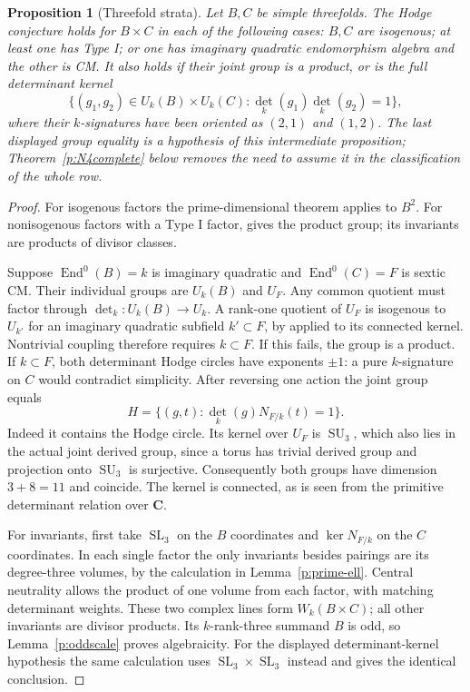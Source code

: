 \documentclass[11pt,reqno]{article}
\theoremstyle{emphasizedplain}
\newtheorem{proposition}[theorem]{Proposition}
\theoremstyle{emphasizeddefinition}
\theoremstyle{emphasizeddefinition}
\DeclareMathOperator{\End}{End}
\DeclareMathOperator{\SL}{SL}
\DeclareMathOperator{\SU}{SU}
\newcommand{\C}{\mathbf C}
\begin{document}
\begin{proposition}[Threefold strata]\label{p:N4strata}
Let $B,C$ be simple threefolds. The Hodge conjecture holds for $B\times C$
in each of the following cases: $B,C$ are isogenous; at least one has
Type I; or one has imaginary quadratic endomorphism algebra and the
other is CM. It also holds if their joint group is a product, or is the
full determinant kernel
\[
 \{(g_1,g_2)\in U_k(B)\times U_k(C):\det_k(g_1)\det_k(g_2)=1\},
\]
where their $k$-signatures have been oriented as $(2,1)$ and $(1,2)$.
The last displayed group equality is a hypothesis of this intermediate
proposition; Theorem~\ref{p:N4complete} below removes the need to
assume it in the classification of the whole row.
\end{proposition}
\begin{proof}
For isogenous factors the prime-dimensional theorem applies to $B^2$.
For nonisogenous factors with a Type I factor,
\cite[Proposition (2.4), Lemma (3.4)]{MZ} gives the product group;
its invariants are products of divisor classes.

Suppose $\End^0(B)=k$ is imaginary quadratic and $\End^0(C)=F$ is
sextic CM. Their individual groups are $U_k(B)$ and $U_F$.
Any common quotient must factor through $\det_k:U_k(B)\to U_k$.
A rank-one quotient of $U_F$ is isogenous to $U_{k'}$ for an imaginary
quadratic subfield $k'\subset F$, by \cite[Lemma (3.7)]{MZ} applied
to its connected kernel. Nontrivial coupling therefore requires
$k\subset F$. If this fails, the group is a product.
If $k\subset F$, both determinant Hodge circles have exponents $\pm1$:
a pure $k$-signature on $C$ would contradict simplicity.
After reversing one action the joint group equals
\[
 H=\{(g,t):\det_k(g)N_{F/k}(t)=1\}.
\]
Indeed it contains the Hodge circle. Its kernel over $U_F$ is $\SU_3$,
which also lies in the actual joint derived group, since a torus has
trivial derived group and projection onto $\SU_3$ is surjective.
Consequently both groups have dimension $3+8=11$ and coincide.
The kernel is connected, as is seen from the primitive determinant
relation over $\C$.

For invariants, first take $\SL_3$ on the $B$ coordinates and
$\ker N_{F/k}$ on the $C$ coordinates. In each single factor the only
invariants besides pairings are its degree-three volumes, by the
calculation in Lemma~\ref{p:prime-ell}. Central neutrality allows the
product of one volume from each factor, with matching determinant
weights. These two complex lines form $W_k(B\times C)$; all other
invariants are divisor products. Its $k$-rank-three summand $B$ is odd,
so Lemma~\ref{p:oddscale} proves algebraicity.
For the displayed determinant-kernel hypothesis the same calculation
uses $\SL_3\times\SL_3$ instead and gives the identical conclusion.
\end{proof}
\end{document}
